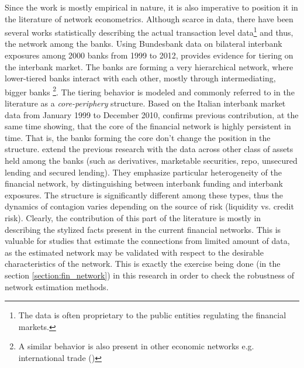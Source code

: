 \documentclass[12pt]{article}
\begin{document}
Since the work is mostly empirical in nature, it is also imperative to position it in the literature of network econometrics. Although scarce in data, there have been several works statistically describing the actual transaction level data\footnote{The data is often proprietary to the public entities regulating the financial markets.} and thus, the network among the banks.  Using Bundesbank data on bilateral interbank exposures among 2000 banks from 1999 to 2012, \cite{craig14} provides evidence for tiering on the interbank market. The banks are forming a very hierarchical network, where lower-tiered banks interact with each other, mostly through intermediating, bigger banks \footnote{A similar behavior is also present in other economic networks e.g. international trade (\cite{antras11})}. The tiering behavior is modeled and commonly referred to in the literature as a \textit{core-periphery} structure. Based on the Italian interbank market data from January 1999 to December 2010, \cite{fricke2015} confirms previous contribution, at the same time showing, that the core of the financial network is highly persistent in time. That is, the banks forming the core don't change the position in the structure. \cite{langfield14} extend the previous research with the data across other class of assets held among the banks (such as derivatives, marketable securities, repo, unsecured lending and secured lending). They emphasize particular heterogeneity of the financial network, by distinguishing between interbank funding and interbank exposures. The structure is significantly different among these types, thus the dynamics of contagion varies depending on the source of risk (liquidity vs. credit risk). Clearly, the contribution of this part of the literature is mostly in describing the stylized facts present in the current financial networks. This is valuable for studies that estimate the connections from limited amount of data, as the estimated network may be validated with respect to the desirable characteristics of the network. This is exactly the exercise being done (in the section \ref{section:fin_network}) in this research in order to check the robustness of network estimation methods. 
\end{document}
